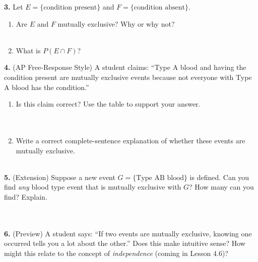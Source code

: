 \documentclass[10pt]{article}
\begin{document}
\begin{practicebox}
\vspace{8pt}
\textbf{3.} Let $E = \{\text{condition present}\}$ and $F = \{\text{condition absent}\}$.

\begin{enumerate}[label=(\alph*), leftmargin=2em, itemsep=6pt]
  \item Are $E$ and $F$ mutually exclusive? Why or why not?\\
        \writeline\\[1pt]\writeline
  \item What is $P(E \cap F)$? \blank{4cm}
\end{enumerate}

\vspace{8pt}
\textbf{4.} (AP Free-Response Style) A student claims: ``Type A blood and having the
condition present are mutually exclusive events because not everyone with Type A blood
has the condition.''
\begin{enumerate}[label=(\alph*), leftmargin=2em, itemsep=6pt]
  \item Is this claim correct? Use the table to support your answer.\\
        \writeline\\[1pt]\writeline\\[1pt]\writeline
  \item Write a correct complete-sentence explanation of whether these events are
        mutually exclusive.\\
        \writeline\\[1pt]\writeline
\end{enumerate}

\vspace{8pt}
\textbf{5.} (Extension) Suppose a new event $G = \{\text{Type AB blood}\}$ is defined.
Can you find \emph{any} blood type event that is mutually exclusive with $G$?
How many can you find? Explain.\\
\writeline\\[1pt]\writeline\\[1pt]\writeline

\vspace{8pt}
\textbf{6.} (Preview) A student says: ``If two events are mutually exclusive, knowing
one occurred tells you a lot about the other.'' Does this make intuitive sense?
How might this relate to the concept of \emph{independence} (coming in Lesson 4.6)?\\
\writeline\\[1pt]\writeline\\[1pt]\writeline
\end{practicebox}
\end{document}
